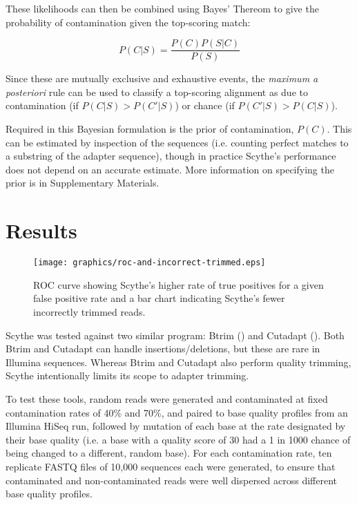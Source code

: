 \documentclass{bioinfo}
\begin{document}
\begin{methods}
These likelihoods can then be combined using Bayes' Thereom to give
the probability of contamination given the top-scoring match:

$$ P(C|S) = \frac{P(C) P(S|C)}{P(S)} $$

Since these are mutually exclusive and exhaustive events, the
\emph{maximum a posteriori} rule can be used to classify a top-scoring
alignment as due to contamination (if $P(C|S) > P(C'|S)$) or chance (if
$P(C'|S) > P(C|S)$).

Required in this Bayesian formulation is the prior of contamination,
$P(C)$. This can be estimated by inspection of the sequences
(i.e. counting perfect matches to a substring of the adapter
sequence), though in practice Scythe's performance does not depend on
an accurate estimate. More information on specifying the prior is in
Supplementary Materials.

\section{Results}
\begin{centering}
\begin{figure*}[!tpb]
\texttt{[image: graphics/roc-and-incorrect-trimmed.eps]}
\caption{ROC curve showing Scythe's higher rate of true positives for
  a given false positive rate and a bar chart indicating Scythe's
  fewer incorrectly trimmed reads.}\label{fig:02}
\end{figure*}
\end{centering}

Scythe was tested against two similar program: Btrim
(\citealp{pmid21651976}) and Cutadapt (\citealp{EJ200}). Both Btrim
and Cutadapt can handle insertions/deletions, but these are rare in
Illumina sequences. Whereas Btrim and Cutadapt also perform quality
trimming, Scythe intentionally limits its scope to adapter trimming.

To test these tools, random reads were generated and contaminated at
fixed contamination rates of 40\% and 70\%, and paired to base quality
profiles from an Illumina HiSeq run, followed by mutation of each base
at the rate designated by their base quality (i.e. a base with a
quality score of 30 had a 1 in 1000 chance of being changed to a
different, random base). For each contamination rate, ten replicate
FASTQ files of 10,000 sequences each were generated, to ensure that
contaminated and non-contaminated reads were well dispersed across
different base quality profiles.


\end{methods}
\end{document}
